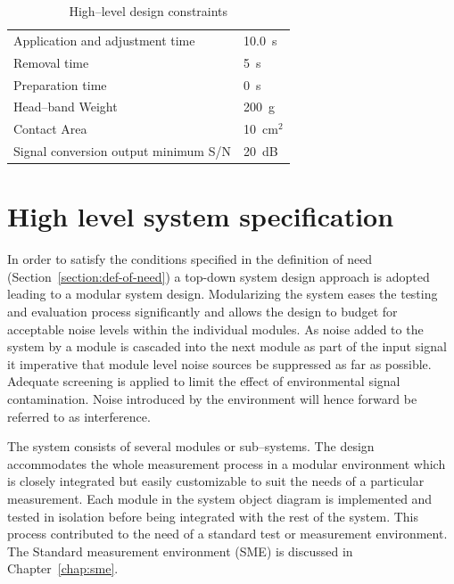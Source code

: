 \begin{table}
\begin{center}
\caption{High--level design constraints}
\label{table:hl-design-contraints}	
\begin{tabular}{|l|l|} 	\hline	
	Application and adjustment time & 10.0~s\\
	Removal time & 5~s\\
	Preparation time & 0~s\\
	Head--band Weight & 200~g\\
	Contact Area & 10~cm$^{2}$\\
	Signal conversion output minimum S/N & 20~dB \\\hline
\end{tabular}
\end{center}
\end{table}



\section{High level system specification}
\label{section:hl-system-specification}
In order to satisfy the conditions specified in the definition of need
(Section~\vref{section:def-of-need}) a top-down system design approach
is adopted leading to a modular system design. Modularizing the system
eases the testing and evaluation process significantly and allows the
design to budget for acceptable noise levels within the individual
modules. As noise added to the system by a module is cascaded into the
next module as part of the input signal it imperative that module
level noise sources be suppressed as far as possible. Adequate
screening is applied to limit the effect of environmental signal
contamination. Noise introduced by the environment will hence forward
be referred to as interference.


The system consists of several modules or sub--systems. The design
accommodates the whole measurement process in a modular environment
which is closely integrated but easily customizable to suit the needs
of a particular measurement. Each module in the system object diagram
is implemented and tested in isolation before being integrated with
the rest of the system. This process contributed to the need of a
standard test or measurement environment. The Standard measurement
environment (SME) is discussed in Chapter~\ref{chap:sme}.

